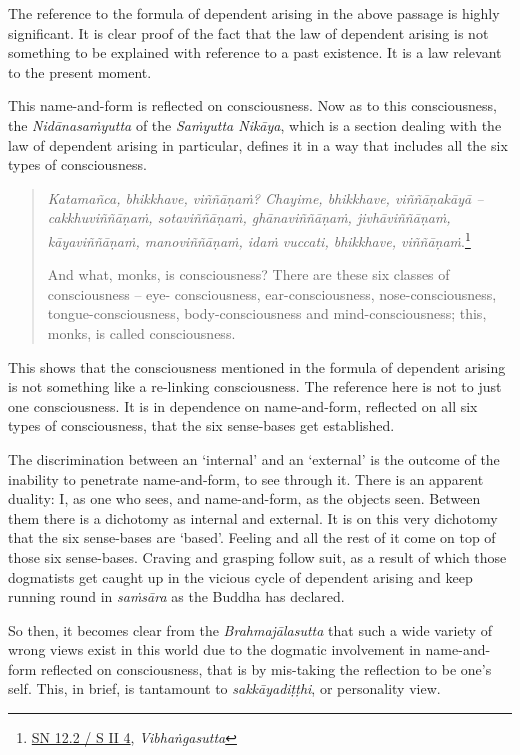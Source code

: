 The reference to the formula of dependent arising in the above passage is highly significant. It is clear proof of the fact that the law of dependent arising is not something to be explained with reference to a past existence. It is a law relevant to the present moment.

This name-and-form is reflected on consciousness. Now as to this consciousness, the \emph{Nidānasaṁyutta} of the \emph{Saṁyutta Nikāya}, which is a section dealing with the law of dependent arising in particular, defines it in a way that includes all the six types of consciousness.

\begin{quote}
\emph{Katamañca, bhikkhave, viññāṇaṁ? Chayime, bhikkhave, viññāṇakāyā -- cakkhuviññāṇaṁ, sotaviññāṇaṁ, ghānaviññāṇaṁ, jivhāviññāṇaṁ, kāyaviññāṇaṁ, manoviññāṇaṁ, idaṁ vuccati, bhikkhave, viññāṇaṁ}.\footnote{\href{https://suttacentral.net/sn12.2/pli/ms}{SN 12.2 / S II 4}, \emph{Vibhaṅgasutta}}

And what, monks, is consciousness? There are these six classes of consciousness -- eye- consciousness, ear-consciousness, nose-consciousness, tongue-consciousness, body-consciousness and mind-consciousness; this, monks, is called consciousness.
\end{quote}

This shows that the consciousness mentioned in the formula of dependent arising is not something like a re-linking consciousness. The reference here is not to just one consciousness. It is in dependence on name-and-form, reflected on all six types of consciousness, that the six sense-bases get established.

The discrimination between an `internal' and an `external' is the outcome of the inability to penetrate name-and-form, to see through it. There is an apparent duality: I, as one who sees, and name-and-form, as the objects seen. Between them there is a dichotomy as internal and external. It is on this very dichotomy that the six sense-bases are `based'. Feeling and all the rest of it come on top of those six sense-bases. Craving and grasping follow suit, as a result of which those dogmatists get caught up in the vicious cycle of dependent arising and keep running round in \emph{saṁsāra} as the Buddha has declared.

So then, it becomes clear from the \emph{Brahmajālasutta} that such a wide variety of wrong views exist in this world due to the dogmatic involvement in name-and-form reflected on consciousness, that is by mis-taking the reflection to be one's self. This, in brief, is tantamount to \emph{sakkāyadiṭṭhi}, or personality view.

